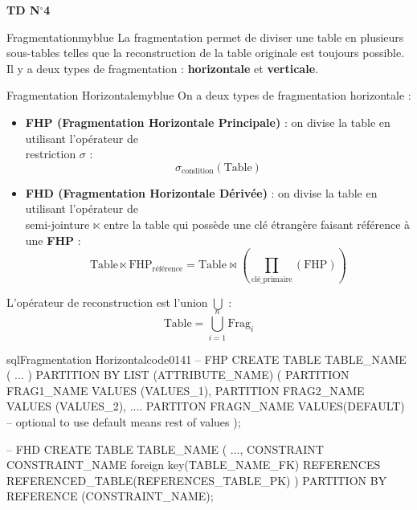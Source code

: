 \documentclass{article}
\newcommand{\tit}[1]{
\begin{center}
    \Large{\textbf{{#1}}}
\end{center}
}
\begin{document}
\tit{TD N\(^{\boldsymbol{\circ}}\)\hspace{0.1cm}4}

\vspace{0.35cm}


\begin{prettyBox}{Fragmentation}{myblue}
    La fragmentation permet de diviser une table en plusieurs sous-tables telles que
    la reconstruction de la table originale est toujours possible. Il y a deux types de
    fragmentation : \textbf{horizontale} et \textbf{verticale}.
\end{prettyBox}

\vspace{0.45cm}
\begin{prettyBox}{Fragmentation Horizontale}{myblue}
    On a deux types de fragmentation horizontale :
    \begin{itemize}
        \item \textbf{FHP (Fragmentation Horizontale Principale)} : on divise la table en utilisant l'opérateur de\\restriction $\sigma$ :
            \[
                \sigma_{\text{condition}} (\text{Table})
            \]
        \item \textbf{FHD (Fragmentation Horizontale Dérivée)} : on divise la table en utilisant l'opérateur de \\semi-jointure $\ltimes$ entre
            la table qui possède une clé étrangère faisant référence à une \textbf{FHP} :
            \[
                \text{Table} \ltimes \text{FHP}_{\text{référence}}
                = \text{Table} \bowtie \left( {\textstyle\prod_{\text{clé\_primaire}}} (\text{FHP}) \right)
            \]
    \end{itemize}

    L'opérateur de reconstruction est l'union $\bigcup$ :
    \[
        \text{Table} = \bigcup_{i=1}^{n} \text{Frag}_i
    \]
\end{prettyBox}

\vspace{0.45cm}
\begin{codeInput}{sql}{Fragmentation Horizontal}{code01}{41}
-- FHP
CREATE TABLE TABLE_NAME (
    ...
 )
 PARTITION BY LIST (ATTRIBUTE_NAME) (
    PARTITION FRAG1_NAME VALUES (VALUES_1),
    PARTITION FRAG2_NAME VALUES (VALUES_2),
    ....
    PARTITON FRAGN_NAME VALUES(DEFAULT) -- optional to use default means rest of values
 );

-- FHD
CREATE TABLE TABLE_NAME (
    ...,
CONSTRAINT CONSTRAINT_NAME foreign key(TABLE_NAME_FK) REFERENCES 
REFERENCED_TABLE(REFERENCES_TABLE_PK) ) PARTITION BY REFERENCE (CONSTRAINT_NAME);

\end{codeInput}
\end{document}
